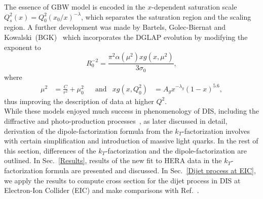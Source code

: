 \documentclass[12pt]{article}
\numberwithin{equation}{section}
\numberwithin{table}{section}
\numberwithin{figure}{section}
\begin{document}
The essence of GBW model is encoded in the $x$-dependent saturation scale $Q_s^2(x)=Q^2_0(x_0/x)^{-\lambda}$, which separates the saturation region and the scaling region.
A further development was made by Bartels, Golec-Biernat and Kowalski~(BGK)~\cite{Bartels:2002cj} which incorporates the DGLAP evolution by modifying the exponent to 
\begin{equation}
R_0^{-2}=\frac{\pi^2\alpha(\mu^2)xg(x,\mu^2)}{3\sigma_0},
\end{equation}
where
\begin{align}
\mu^2&=\frac{C}{r^2}+\mu_0^2 & &\mathrm{and} & xg(x,Q^2_0)&=A_g x^{-\lambda_g}(1-x)^{5.6},
\end{align}
thus improving the description of data at higher $Q^2$.\\
While these models enjoyed much success in phenomenology of DIS, including the diffractive and photo-production processes~\cite{Golec-Biernat:1998zce,Golec-Biernat:1999qor}, as later discussed in detail, derivation of the dipole-factorization formula from the $k_T$-factorization involves with certain simplification and introduction of massive light quarks. 
In the rest of this section, differences of the $k_T$-factorization and the dipole-factorization are outlined.  In Sec.~\ref{Results}, results of the new fit to HERA data in the $k_T$-factorization formula are presented and discussed. In Sec.~\ref{Dijet process at EIC}, we apply the results to compute cross section for the dijet process in DIS at Electron-Ion Collider (EIC) and make comparisons with Ref.~\cite{vanHameren:2021sqc}.\\
\end{document}
